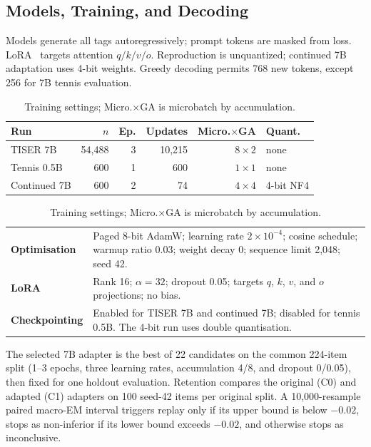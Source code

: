 \documentclass[conference]{IEEEtran}
\begin{document}
\subsection{Models, Training, and Decoding}

Models generate all tags autoregressively; prompt tokens are masked from loss. LoRA~\cite{hu2022lora} targets attention $q/k/v/o$. Reproduction is unquantized; continued 7B adaptation uses 4-bit weights. Greedy decoding permits 768 new tokens, except 256 for 7B tennis evaluation.

\begin{table}[t]
\centering
\caption{Training settings; Micro.$\times$GA is microbatch by accumulation.}
\label{tab:settings}
\setlength{\tabcolsep}{2.3pt}
{\footnotesize
\begin{tabular}{lrrrrl}
\toprule
\textbf{Run} & \textbf{$n$} & \textbf{Ep.} & \textbf{Updates} & \textbf{Micro.$\times$GA} & \textbf{Quant.} \\
\midrule
TISER 7B & 54{,}488 & 3 & 10{,}215 & $8{\times}2$ & none \\
Tennis 0.5B & 600 & 1 & 600 & $1{\times}1$ & none \\
Continued 7B & 600 & 2 & 74 & $4{\times}4$ & 4-bit NF4 \\
\bottomrule
\end{tabular}

\vspace{0.4em}
\begin{tabular}{@{}lp{}@{}}
\textbf{Optimisation} & Paged 8-bit AdamW; learning rate $2{\times}10^{-4}$; cosine schedule; warmup ratio 0.03; weight decay 0; sequence limit 2,048; seed 42. \\
\textbf{LoRA} & Rank 16; $\alpha=32$; dropout 0.05; targets $q$, $k$, $v$, and $o$ projections; no bias. \\
\textbf{Checkpointing} & Enabled for TISER 7B and continued 7B; disabled for tennis 0.5B. The 4-bit run uses double quantisation. \\
\end{tabular}
}
\end{table}

The selected 7B adapter is the best of 22 candidates on the common 224-item split (1--3 epochs, three learning rates, accumulation 4/8, and dropout 0/0.05), then fixed for one holdout evaluation. Retention compares the original (C0) and adapted (C1) adapters on 100 seed-42 items per original split. A 10,000-resample paired macro-EM interval triggers replay only if its upper bound is below $-0.02$, stops as non-inferior if its lower bound exceeds $-0.02$, and otherwise stops as inconclusive.
\end{document}
